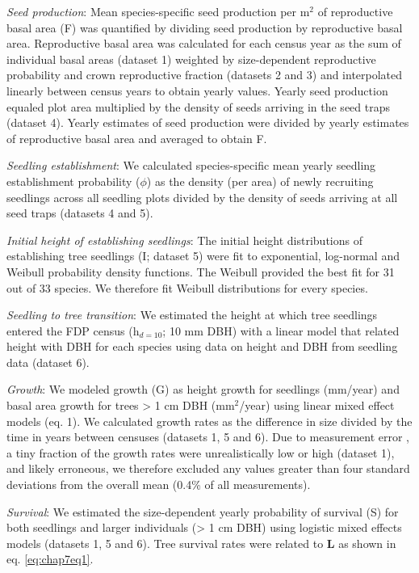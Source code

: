 \documentclass[b5paper,justified]{tufte-book} %
\begin{document}
\begin{fullwidth}
\textit{Seed production}: Mean species-specific seed production per m$^2$ of reproductive basal area (F) was quantified by dividing seed production by reproductive basal area. Reproductive basal area was calculated for each census year as the sum of individual basal areas (dataset 1) weighted by size-dependent reproductive probability and crown reproductive fraction (datasets 2 and 3) and interpolated linearly between census years to obtain yearly values. Yearly seed production equaled plot area multiplied by the density of seeds arriving in the seed traps (dataset 4). Yearly estimates of seed production were divided by yearly estimates of reproductive basal area and averaged to obtain F. 

\textit{Seedling establishment}: We calculated species-specific mean yearly seedling establishment probability ($\phi$) as the density (per area) of newly recruiting seedlings across all seedling plots divided by the density of seeds arriving at all seed traps (datasets 4 and 5). 

\textit{Initial height of establishing seedlings}: The initial height distributions of establishing tree seedlings (I; dataset 5) were fit to exponential, log-normal and Weibull probability density functions. The Weibull provided the best fit for 31 out of 33 species. We therefore fit Weibull distributions for every species.

\textit{Seedling to tree transition}: We estimated the height at which tree seedlings entered the FDP census (h$_{d=10}$; 10 mm DBH) with a linear model that related height with DBH for each species using data on height and DBH from seedling data (dataset 6).

\textit{Growth}: We modeled growth (G) as height growth for seedlings (mm/year) and basal area growth for trees > 1 cm DBH (mm$^2$/year) using linear mixed effect models (eq. 1). We calculated growth rates as the difference in size divided by the time in years between censuses (datasets 1, 5 and 6). Due to measurement error \citep{Rueger2011}, a tiny fraction of the growth rates were unrealistically low or high (dataset 1), and likely erroneous, we therefore excluded any values greater than four standard deviations from the overall mean (0.4\% of all measurements). 

\textit{Survival}: We estimated the size-dependent yearly probability of survival (S) for both seedlings and larger individuals (> 1 cm DBH) using logistic mixed effects models (datasets 1, 5 and 6). Tree survival rates were related to \textbf{L} as shown in eq. \ref{eq:chap7eq1}. 
 

\end{fullwidth}
\end{document}

